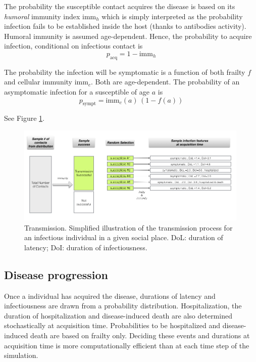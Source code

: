 \documentclass[11pt, onecolumn]{article}
\newcommand{\immh}{\ensuremath{\text{imm}_h}}
\newcommand{\immc}{\ensuremath{\text{imm}_c}}
\begin{document}
The probability the susceptible contact acquires the disease is based on its \emph{humoral} immunity index $\immh$ which is simply interpreted as the probability infection fails to be established inside the host (thanks to antibodies activity). Humoral immunity is assumed age-dependent. Hence, the probability to acquire infection, conditional on infectious contact is
\begin{equation}
p_{\text{acq}} = 1 - \immh
\end{equation}

The probability the infection will be symptomatic is a function of both frailty $f$ and cellular immunity \immc. Both are age-dependent. The probability of an asymptomatic infection for a susceptible of age $a$ is
\begin{equation}
p_{\text{sympt}} = \immc(a) \, (1-f(a))
\end{equation}

See Figure \ref{fig:transmission}.


\begin{figure}[!ht]
\centering
    \includegraphics[angle=0,width=0.99\textwidth]{figures/transmission.jpg}
\caption{Transmission. Simplified illustration of the transmission process for an infectious individual in a given social place. DoL: duration of latency; DoI: duration of infectiousness.}
\label{fig:transmission}
\end{figure}


\subsection{Disease progression}

Once a individual has acquired the disease, durations of latency and infectiousness are drawn from a probability distribution. Hospitalization, the duration of hospitalization and disease-induced death are also determined stochastically at acquisition time.
Probabilities to be hospitalized and disease-induced death are based on frailty only.
Deciding these events and durations at acquisition time is more computationally efficient than at each time step of the simulation.
\end{document}
